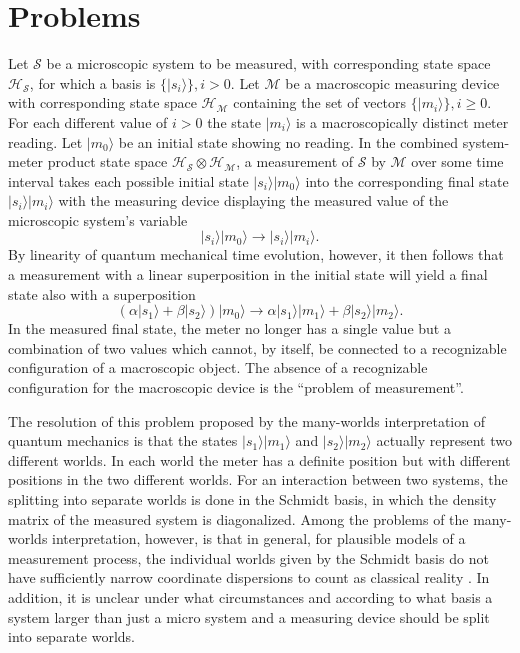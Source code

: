 \documentclass[12pt,amsmath,amssymb,onecolumn]{revtex4-2}
\begin{document}
\section{\label{sec:problems}Problems}
Let $\mathcal{S}$ be a microscopic system to be measured, with corresponding state space $\mathcal{H}_\mathcal{S}$,
for which a basis is $\{|s_i \rangle \}, i > 0$.
Let $\mathcal{M}$ be a macroscopic measuring device with corresponding state space $\mathcal{H}_\mathcal{M}$
containing the set of vectors $\{ |m_i \rangle \}, i \geq 0$.  For each different value of $i > 0$ the state $|m_i \rangle $ is 
a macroscopically distinct meter reading.
Let $|m_0 \rangle $ be an initial state showing no reading. In the 
combined system-meter product state space 
$\mathcal{H}_\mathcal{S} \otimes \mathcal{H}_\mathcal{M}$, a 
measurement of $\mathcal{S}$ by $\mathcal{M}$ over some time interval
takes each possible initial state $|s_i \rangle  |m_0 \rangle $ into the corresponding final state $|s_i \rangle |m_i \rangle $
with the measuring device displaying the measured value of the microscopic system's variable
\begin{equation}
|s_i \rangle  |m_0 \rangle  \rightarrow |s_i \rangle  |m_i \rangle .
\end{equation}
By linearity of quantum mechanical time evolution, however, it then follows that a measurement
with a linear superposition in the initial state will yield a final state also with a superposition
\begin{equation}
(\alpha|s_1 \rangle  + \beta|s_2 \rangle ) |m_0 \rangle  \rightarrow 
\alpha |s_1 \rangle  |m_1 \rangle  + \beta|s_2 \rangle  |m_2 \rangle . 
\end{equation}
In the measured final state, the meter no longer has a single value but a
combination of two values which cannot, by itself,  be connected to a recognizable configuration of a macroscopic object.
The absence of a recognizable configuration for the macroscopic device is the ``problem of measurement''.

The resolution of this problem proposed by the many-worlds interpretation of quantum mechanics \cite{ Everett, DeWitt} 
is that the states $|s_1 \rangle  |m_1 \rangle $ and $|s_2 \rangle  |m_2 \rangle $ actually represent two different worlds. In each world the 
meter has a definite position but with different positions in the two different worlds. For an interaction
between two systems, the splitting into separate worlds is done in the Schmidt basis, in which the density 
matrix of the measured system is diagonalized.  Among the problems of the many-worlds interpretation, however,
is that in general, for plausible models of a measurement process, 
the individual worlds given by the Schmidt basis do not have sufficiently narrow coordinate dispersions to count as classical reality \cite{Page}.  In addition, it is unclear under
what circumstances and according to what basis a system larger than just a micro system and a measuring 
device should be split into separate worlds.
\end{document}
